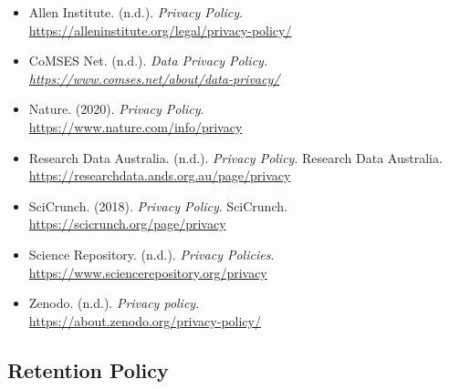 \documentclass[11pt]{article}
\begin{document}
\begin{itemize}

\item Allen Institute. (n.d.). \emph{Privacy Policy}.\\
\url{https://alleninstitute.org/legal/privacy-policy/}

\item CoMSES Net. (n.d.). \emph{Data Privacy Policy.\\
\url{https://www.comses.net/about/data-privacy/}}

\item Nature. (2020). \emph{Privacy Policy}.\\
\url{https://www.nature.com/info/privacy}

\item Research Data Australia. (n.d.). \emph{Privacy Policy}. Research Data Australia.\\
\url{https://researchdata.ands.org.au/page/privacy}

\item SciCrunch. (2018). \emph{Privacy Policy}. SciCrunch.\\
\url{https://scicrunch.org/page/privacy}

\item Science Repository. (n.d.). \emph{Privacy Policies}.\\
\url{https://www.sciencerepository.org/privacy}

\item Zenodo. (n.d.). \emph{Privacy policy}.\\
\url{https://about.zenodo.org/privacy-policy/}

\end{itemize}


\subsection{Retention Policy}
\label{retention-policy}
\end{document}

